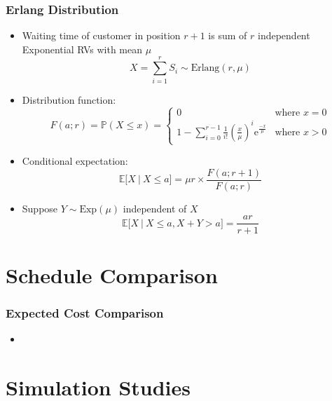 \documentclass{beamer}
\begin{document}
\begin{frame}
	\frametitle{Erlang Distribution}

	\begin{itemize}
		\item Waiting time of customer in position $r + 1$ is sum of $r$ independent Exponential RVs with mean $\mu$
		\begin{equation*}
		 	X = \sum_{i = 1}^{r} S_{i} \sim \text{Erlang} (r, \mu)
		\end{equation*}
		\item Distribution function:
		\begin{equation*}
			F (a; r) = \mathbb{P} (X \leq x) = \begin{cases} 0 & \text{where $x = 0$} \\ 1 - \sum_{i = 0}^{r - 1} \frac{1}{i!} \left( \frac{x}{\mu} \right)^{i} \mathrm{e}^{\frac{-x}{\mu}} & \text{where $x > 0$} \end{cases}
		\end{equation*}
		\item Conditional expectation:
		\begin{equation*}
			\mathbb{E} \Big[ X \ \big| \ X \leq a \Big] = \mu r \times \frac{F (a; r + 1)}{F (a; r)}
		\end{equation*}
		\item Suppose $Y \sim \text{Exp} (\mu)$ independent of $X$ 
		\begin{equation*}
			\mathbb{E} \Big[ X \ \big| \ X \leq a, X + Y > a \Big] = \frac{a r}{r + 1}
		\end{equation*}
	\end{itemize}
\end{frame}

\section{Schedule Comparison}

\begin{frame}
	\frametitle{Expected Cost Comparison}

	\begin{itemize}
		\item 
	\end{itemize}
\end{frame}

\section{Simulation Studies}
\end{document}
